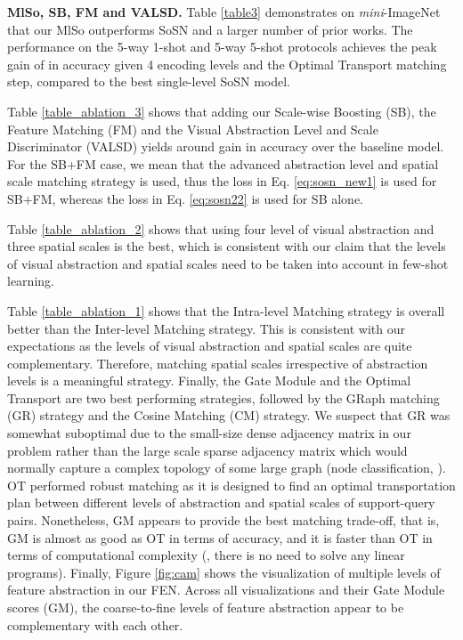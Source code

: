 \vspace{0.05cm}
{ \noindent\textbf{MlSo, SB, FM and VALSD. } Table \ref{table3} demonstrates on \textit{mini}-ImageNet that our MlSo outperforms SoSN and a larger number of prior works. The performance on the 5-way 1-shot and  5-way 5-shot protocols achieves the peak gain of  in accuracy  given 4 encoding levels and the Optimal Transport matching step, compared to the best single-level SoSN model.

Table \ref{table_ablation_3} shows that adding our Scale-wise Boosting (SB), the Feature Matching (FM) and the Visual Abstraction Level and Scale Discriminator (VALSD) yields  around  gain in accuracy over the baseline model. For the SB+FM case, we mean that the advanced abstraction level and spatial scale matching strategy is used, thus the loss in Eq. \eqref{eq:sosn_new1} is used for SB+FM, whereas the loss in Eq. \eqref{eq:sosn22} is used for SB alone.

Table  \ref{table_ablation_2} shows that using four level of visual abstraction and three spatial scales is the best, which is consistent with our claim that the levels of visual abstraction and spatial scales need to be taken into account in few-shot learning.

Table \ref{table_ablation_1} shows that the Intra-level Matching strategy is overall better than the Inter-level Matching strategy. This is consistent with our expectations as the levels of visual abstraction and spatial scales are quite complementary. Therefore, matching spatial scales irrespective of abstraction levels is a meaningful strategy. Finally, the Gate Module and the Optimal Transport are two best performing strategies,  followed by the GRaph matching (GR) strategy and the Cosine Matching (CM) strategy. We suspect that GR was somewhat suboptimal due to the small-size dense adjacency matrix in our problem rather than the large scale sparse adjacency matrix which would normally capture a complex topology of some large graph (node classification, \etc).  OT performed robust matching as it is designed to find an optimal transportation plan between different levels of abstraction and spatial scales of support-query pairs. Nonetheless, GM appears to provide the best matching trade-off, that is, GM is almost as good as OT in terms of accuracy, and it is faster than OT in terms of computational complexity (\ie, there is no need to solve any linear programs). 
Finally, Figure \ref{fig:cam} shows
the visualization of multiple levels of feature abstraction in our FEN. Across all visualizations and their Gate Module scores (GM), the coarse-to-fine levels of feature abstraction appear to be complementary with each other. 
} 

